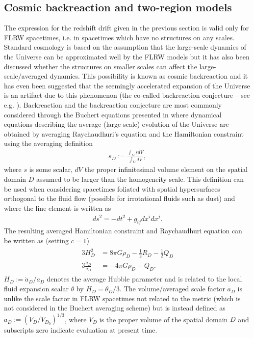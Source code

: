 \documentclass[a4paper,11pt]{article}
\begin{document}
\subsection{Cosmic backreaction and two-region models}
	The expression for the redshift drift given in the previous section is valid only for FLRW spacetimes, i.e. in spacetimes which have no structures on any scales. Standard cosmology is based on the assumption that the large-scale dynamics of the Universe can be approximated well by the FLRW models but it has also been discussed whether the structures on smaller scales can affect the large-scale/averaged dynamics. This possibility is known as cosmic backreaction \cite{bc_review1, bc_review2, bc_review3, bc_review4} and it has even been suggested that the seemingly accelerated expansion of the Universe is an artifact due to this phenomenon (the co-called backreaction conjecture -- see e.g. \cite{conjecture1, conjecture2, conjecture3, conjecture4}). Backreaction and the backreaction conjecture are most commonly considered through the Buchert equations presented in \cite{dust, perfect_fluid, general} where dynamical equations describing the average (large-scale) evolution of the Universe are obtained by averaging Raychaudhuri's equation and the Hamiltonian constraint using the averaging definition
	\begin{align}
	    s_D:=\frac{\int_D sdV}{\int_D dV},
	\end{align}
	where $s$ is some scalar, $dV$ the proper infinitesimal volume element on the spatial domain $D$ assumed to be larger than the homogeneity scale. This definition can be used when considering spacetimes foliated with spatial hypersurfaces orthogonal to the fluid flow (possible for irrotational fluids such as dust) and where the line element is written as
	\begin{align}
	    ds^2 = -dt^2 + g_{ij}dx^idx^j.
	\end{align}
	The resulting averaged Hamiltonian constraint and Raychaudhuri equation can be written as (setting $c=1$)
	\begin{align}\label{eq:Buchert_av}
	\begin{split}
	    3H_D^2 &= 8\pi G\rho_D - \frac{1}{2}R_D - \frac{1}{2}Q_D\\
	    3\frac{\ddot a_D}{a_D} &= -4\pi G\rho_D + Q_D.
	\end{split}
	\end{align}
	$H_D:=\dot a_D/a_D$ denotes the average Hubble parameter and is related to the local fluid expansion scalar $\theta$ by $H_D=\theta_D/3$. The volume/averaged scale factor $a_D$ is unlike the scale factor in FLRW spacetimes not related to the metric (which is not considered in the Buchert averaging scheme) but is instead defined as $a_D:=(V_D/V_{D_0})^{1/3}$, where $V_D$ is the proper volume of the spatial domain $D$ and subscripts zero indicate evaluation at present time.
	
\end{document}
